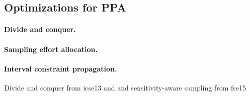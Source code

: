 \subsection{Optimizations for PPA}\label{sec:computingprobabilitiesOptimizations}

\paragraph{Divide and conquer.}

\paragraph{Sampling effort allocation.}

\paragraph{Interval constraint propagation.}

Divide and conquer from icse13 and and sensitivity-aware sampling from fse15
